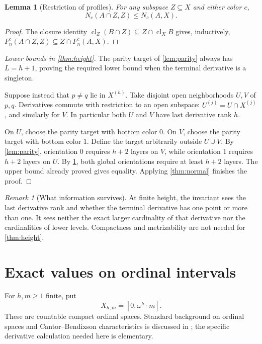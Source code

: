 \documentclass[11pt,letterpaper]{article}
\numberwithin{equation}{section}
\newtheorem{lemma}[lemma]{Lemma}
\theoremstyle{definition}
\theoremstyle{remark}
\newtheorem{remark}[remark]{Remark}
\newcommand{\cl}{\operatorname{cl}}
\begin{document}
\begin{lemma}[Restriction of profiles]\label{lem:profile-restrict}
For any subspace $Z\subseteq X$ and either color $c$,
\[
 N_c(A\cap Z,Z)\leq N_c(A,X).
\]
\end{lemma}
\begin{proof}
The closure identity
$\cl_Z(B\cap Z)\subseteq Z\cap\cl_X B$ gives, inductively,
$F^c_n(A\cap Z,Z)\subseteq Z\cap F^c_n(A,X)$.
\end{proof}

\begin{proof}[Lower bounds in \cref{thm:height}]
The parity target of \cref{lem:parity} always has $L=h+1$, proving the required
lower bound when the terminal derivative is a singleton.

Suppose instead that $p\ne q$ lie in $X^{(h)}$. Take disjoint open neighborhoods
$U,V$ of $p,q$. Derivatives commute with restriction to an open subspace:
$U^{(j)}=U\cap X^{(j)}$, and similarly for $V$. In particular both $U$ and $V$
have last derivative rank $h$.

On $U$, choose the parity target with bottom color $0$. On $V$, choose the parity
target with bottom color $1$. Define the target arbitrarily outside $U\cup V$.
By \cref{lem:parity}, orientation $0$ requires $h+2$ layers on $V$, while
orientation $1$ requires $h+2$ layers on $U$. By
\cref{lem:profile-restrict}, both global orientations require at least $h+2$
layers. The upper bound already proved gives equality. Applying
\cref{thm:normal} finishes the proof.
\end{proof}

\begin{remark}[What information survives]
At finite height, the invariant sees the last derivative rank and whether the
terminal derivative has one point or more than one. It sees neither the exact
larger cardinality of that derivative nor the cardinalities of lower levels.
Compactness and metrizability are not needed for \cref{thm:height}.
\end{remark}

\section{Exact values on ordinal intervals}\label{sec:ordinals}

For $h,m\geq1$ finite, put
\[
 X_{h,m}=[0,\omega^h\cdot m].
\]
These are countable compact ordinal spaces. Standard background on ordinal
spaces and Cantor--Bendixson characteristics is discussed in \cite{AM}; the
specific derivative calculation needed here is elementary.
\end{document}
